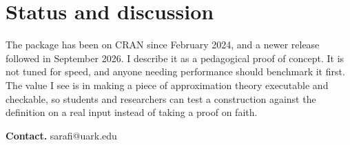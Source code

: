 \section{Status and discussion}
The package has been on CRAN since February 2024, and a newer release followed in September 2026. I describe it as a pedagogical proof of concept. It is not tuned for speed, and anyone needing performance should benchmark it first. The value I see is in making a piece of approximation theory executable and checkable, so students and researchers can test a construction against the definition on a real input instead of taking a proof on faith.

\textbf{Contact.} sarafi@uark.edu

